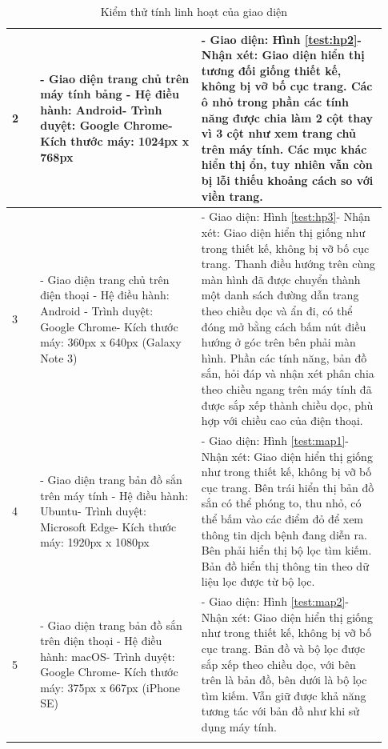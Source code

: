 \documentclass[./../main.tex]{subfiles}
\begin{document}
\begin{itemize}
\begin{longtable}{| p{0.07\linewidth} | p{0.4\linewidth} | p{0.46\linewidth} |}
        \centerline{2} & - Giao diện trang chủ trên máy tính bảng \newline - Hệ điều hành: Android\newline - Trình duyệt: Google Chrome\newline - Kích thước máy: 1024px x 768px & - Giao diện: Hình \ref{test:hp2}\newline - Nhận xét: Giao diện hiển thị tương đối giống thiết kế, không bị vỡ bố cục trang. Các ô nhỏ trong phần các tính năng được chia làm 2 cột thay vì 3 cột như xem trang chủ trên máy tính. Các mục khác hiển thị ổn, tuy nhiên vẫn còn bị lỗi thiếu khoảng cách so với viền trang.\\ \hline
        \centerline{3} & - Giao diện trang chủ trên điện thoại \newline - Hệ điều hành: Android \newline - Trình duyệt: Google Chrome\newline - Kích thước máy: 360px x 640px (Galaxy Note 3) & - Giao diện: Hình \ref{test:hp3}\newline - Nhận xét: Giao diện hiển thị giống như trong thiết kế, không bị vỡ bố cục trang. Thanh điều hướng trên cùng màn hình đã được chuyển thành một danh sách đường dẫn trang theo chiều dọc và ẩn đi, có thể đóng mở bằng cách bấm nút điều hướng ở góc trên bên phải màn hình. Phần các tính năng, bản đồ sắn, hỏi đáp và nhận xét phân chia theo chiều ngang trên máy tính đã được sắp xếp thành chiều dọc, phù hợp với chiều cao của điện thoại.\\ \hline
        \centerline{4} & - Giao diện trang bản đồ sắn trên máy tính \newline - Hệ điều hành: Ubuntu\newline - Trình duyệt: Microsoft Edge\newline - Kích thước máy: 1920px x 1080px & - Giao diện: Hình \ref{test:map1}\newline - Nhận xét: Giao diện hiển thị giống như trong thiết kế, không bị vỡ bố cục trang. Bên trái hiển thị bản đồ sắn có thể phóng to, thu nhỏ, có thể bấm vào các điểm đỏ để xem thông tin dịch bệnh đang diễn ra. Bên phải hiển thị bộ lọc tìm kiếm. Bản đồ hiển thị thông tin theo dữ liệu lọc được từ bộ lọc.\\ \hline
        \centerline{5} & - Giao diện trang bản đồ sắn trên điện thoại \newline - Hệ điều hành: macOS\newline - Trình duyệt: Google Chrome\newline - Kích thước máy: 375px x 667px (iPhone SE) & - Giao diện: Hình \ref{test:map2}\newline - Nhận xét: Giao diện hiển thị giống như trong thiết kế, không bị vỡ bố cục trang. Bản đồ và bộ lọc được sắp xếp theo chiều dọc, với bên trên là bản đồ, bên dưới là bộ lọc tìm kiếm. Vẫn giữ được khả năng tương tác với bản đồ như khi sử dụng máy tính.\\ \hline
        \caption{\label{test-ui}Kiểm thử tính linh hoạt của giao diện}
    \end{longtable}
    

\end{itemize}
\end{document}
